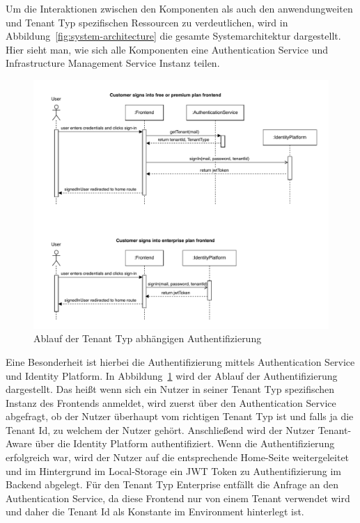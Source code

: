 Um die Interaktionen zwischen den Komponenten als auch den anwendungweiten und Tenant Typ spezifischen Ressourcen zu verdeutlichen, wird in Abbildung~\ref{fig:system-architecture} die gesamte Systemarchitektur dargestellt. Hier sieht man, wie sich alle Komponenten eine Authentication Service und Infrastructure Management Service Instanz teilen.

\begin{figure}[ht]
  \centering
  \includegraphics[width=\textwidth]{resources/03-runtime-view/pdf/authentication-sequence.pdf}
  \caption{Ablauf der Tenant Typ abhängigen Authentifizierung}
  \label{fig:authentication-sequence}
\end{figure}

Eine Besonderheit ist hierbei die Authentifizierung mittels Authentication Service und Identity Platform. In Abbildung~\ref{fig:authentication-sequence} wird der Ablauf der Authentifizierung dargestellt. Das heißt wenn sich ein Nutzer in seiner Tenant Typ spezifischen Instanz des Frontends anmeldet, wird zuerst über den Authentication Service abgefragt, ob der Nutzer überhaupt vom richtigen Tenant Typ ist und falls ja die Tenant Id, zu welchem der Nutzer gehört. Anschließend wird der Nutzer Tenant-Aware über die Identity Platform authentifiziert. Wenn die Authentifizierung erfolgreich war, wird der Nutzer auf die entsprechende Home-Seite weitergeleitet und im Hintergrund im Local-Storage ein JWT Token zu Authentifizierung im Backend abgelegt. 
Für den Tenant Typ Enterprise entfällt die Anfrage an den Authentication Service, da diese Frontend nur von einem Tenant verwendet wird und daher die Tenant Id als Konstante im Environment hinterlegt ist.

